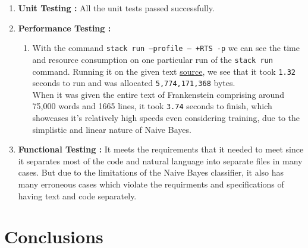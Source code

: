 \documentclass[12pt]{scrreprt}
\newcommand{\ttt}[1]{\texttt{#1}}
\begin{document}
\begin{enumerate}
    \item \textbf{Unit Testing : } All the unit tests passed successfully.
    \item \textbf{Performance Testing : }
    \begin{enumerate}
        \item With the command \ttt{stack run --profile -- +RTS -p} we can see the time and resource consumption on one particular run of the \ttt{stack run} command. Running it on the given text \href{https://eli.thegreenplace.net/2018/type-erasure-and-reification/}{source}, we see that it took \ttt{1.32} seconds to run and was allocated \ttt{5,774,171,368} bytes. \\ When it was given the entire text of Frankenstein comprising around 75,000 words and 1665 lines, it took \ttt{3.74} seconds to finish, which showcases it's relatively high speeds even considering training, due to the simplistic and linear nature of Naive Bayes.
    \end{enumerate}

    \item \textbf{Functional Testing : } It meets the requirements that it needed to meet since it separates most of the code and natural language into separate files in many cases. But due to the limitations of the Naive Bayes classifier, it also has many erroneous cases which violate the requirments and specifications of having text and code separately. 
    
\end{enumerate}















\chapter{Conclusions}
\end{document}
